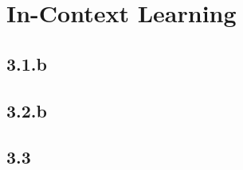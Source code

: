 \documentclass{article}
\begin{document}
\subsection{}


\section{In-Context Learning}
\subsection*{3.1.b}

\subsection*{3.2.b}

\subsection*{3.3}



\newpage


\end{document}
